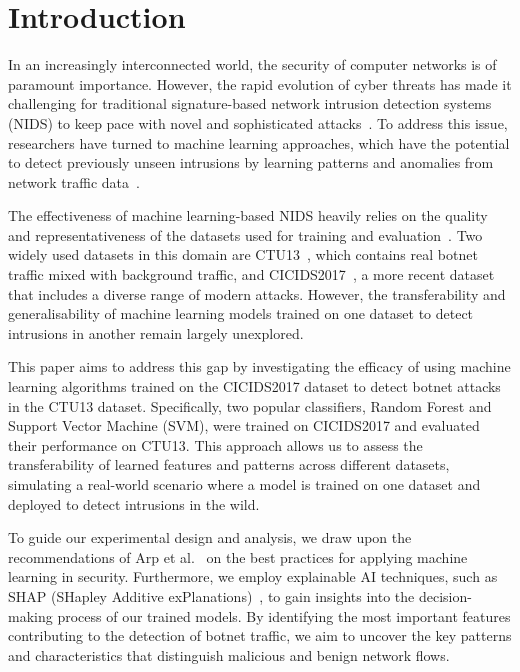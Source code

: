 \chapter{Introduction}

In an increasingly interconnected world, the security of computer networks is of paramount importance. However, the rapid evolution of cyber threats has made it challenging for traditional signature-based network intrusion detection systems (NIDS) to keep pace with novel and sophisticated attacks~\cite{marchetti2016analysis}. To address this issue, researchers have turned to machine learning approaches, which have the potential to detect previously unseen intrusions by learning patterns and anomalies from network traffic data~\cite{buczak2015survey}.

The effectiveness of machine learning-based NIDS heavily relies on the quality and representativeness of the datasets used for training and evaluation~\cite{engelen2021troubleshooting}. Two widely used datasets in this domain are CTU13~\cite{garcia2014empirical}, which contains real botnet traffic mixed with background traffic, and CICIDS2017~\cite{sharafaldin2018toward}, a more recent dataset that includes a diverse range of modern attacks. However, the transferability and generalisability of machine learning models trained on one dataset to detect intrusions in another remain largely unexplored.

This paper aims to address this gap by investigating the efficacy of using machine learning algorithms trained on the CICIDS2017 dataset to detect botnet attacks in the CTU13 dataset. Specifically, two popular classifiers, Random Forest and Support Vector Machine (SVM), were trained on CICIDS2017 and evaluated their performance on CTU13. This approach allows us to assess the transferability of learned features and patterns across different datasets, simulating a real-world scenario where a model is trained on one dataset and deployed to detect intrusions in the wild.

To guide our experimental design and analysis, we draw upon the recommendations of Arp et al.~\cite{arp2022and} on the best practices for applying machine learning in security. Furthermore, we employ explainable AI techniques, such as SHAP (SHapley Additive exPlanations)~\cite{lundberg2017unified}, to gain insights into the decision-making process of our trained models. By identifying the most important features contributing to the detection of botnet traffic, we aim to uncover the key patterns and characteristics that distinguish malicious and benign network flows.


